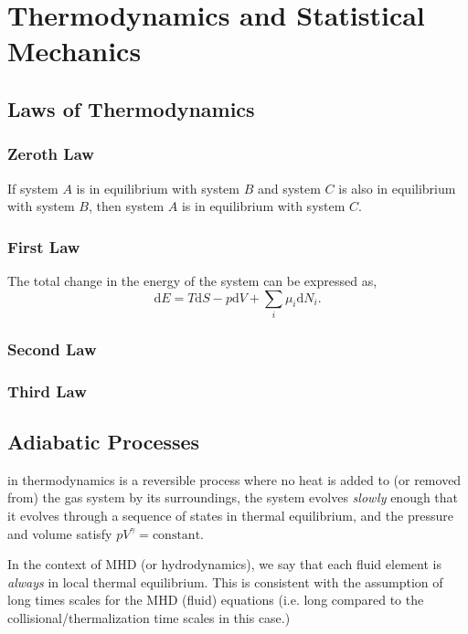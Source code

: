 \chapter{Thermodynamics and Statistical Mechanics}

\section{Laws of Thermodynamics}

	\subsection{Zeroth Law}
	If system $A$ is in equilibrium with system $B$ and system $C$ is also in equilibrium with system $B$, then system $A$ is in equilibrium with system $C$.
		
	\subsection{First Law}
	The total change in the energy of the system can be expressed as,
	\begin{equation}
		\mathrm{d}E = T\mathrm{d}S - p\mathrm{d}V + \sum_i\mu_i\mathrm{d}N_i.
	\end{equation}
		
	\subsection{Second Law}
	\subsection{Third Law}

\section{Adiabatic Processes}
 in thermodynamics is a reversible process where no heat is added to (or removed from) the gas system by its surroundings, the system evolves \textit{slowly} enough that it evolves through a sequence of states in thermal equilibrium, and the pressure and volume satisfy $pV^{\gamma}=\text{constant}$. 

In the context of MHD (or hydrodynamics), we say that each fluid element is \textit{always} in local thermal equilibrium. This is consistent with the assumption of long times scales for the MHD (fluid) equations (i.e. long compared to the collisional/thermalization time scales in this case.)

